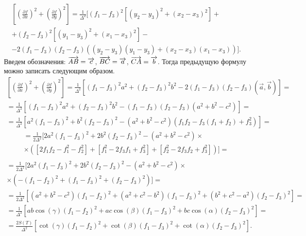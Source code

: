     \begin{eqnarray*}
        \left[\left(\frac{\partial f}{\partial x}\right)^2 + \left(\frac{\partial f}{\partial y}\right)^2 \right] = 
        \frac{1}{\Delta^2} 
        [
            (f_1 - f_3)^2 [(y_2 - y_3)^2 + (x_2 - x_3)^2] + \\ + (f_2 - f_3)^2 [(y_1 - y_3)^2 + (x_1 - x_3)^2] - \\
            - 2 (f_1 - f_3)(f_2 - f_3)((y_2 - y_3)(y_1 - y_3) + (x_2 - x_3)(x_1 - x_3))
        ].
    \end{eqnarray*}
    Введем обозначения: $\overrightarrow{AB} = \overrightarrow{c}$, $\overrightarrow{BC} = \overrightarrow{a}$, $\overrightarrow{CA} = \overrightarrow{b}$. Тогда предыдущую формулу можно записать следующим образом.
    \begin{eqnarray*}
        \left[\left(\frac{\partial f}{\partial x}\right)^2 + \left(\frac{\partial f}{\partial y}\right)^2 \right] = 
        \frac{1}{\Delta^2} 
        \left[
            (f_1 - f_3)^2 a^2 + (f_2 - f_3)^2 b^2 - 2 (f_1 - f_3)(f_2 - f_3)(\vec{a}, \vec{b}) 
        \right] = \\
        = \frac{1}{\Delta^2} 
        \left[
            (f_1 - f_3)^2 a^2 + (f_2 - f_3)^2 b^2 - (f_1 - f_3)(f_2 - f_3)(a^2 + b^2 - c^2) 
        \right] = \\
        = \frac{1}{\Delta^2} 
        \left[
            a^2 (f_1 - f_3)^2 + b^2 (f_2 - f_3)^2 - (a^2 + b^2 - c^2)(f_1 f_2 - f_3(f_1 + f_2) + f_3^2)
        \right] = 
        \end{eqnarray*}
      \begin{multline*}
        = \frac{1}{2 \Delta^2} 
        [
            2 a^2 (f_1 - f_3)^2 + 2 b^2 (f_2 - f_3)^2 - (a^2 + b^2 - c^2) \times \\
            \times ([2 f_1 f_2 - f_1^2 - f_2 ^ 2] + [f_1 ^2 - 2 f_3 f_1 + f_3 ^ 2] + [f_2^2 - 2 f_3 f_2 + f_3^2])
        ] = \\
      \end{multline*}
      \begin{multline*}
        = \frac{1}{2 \Delta^2} 
        [
            2 a^2 (f_1 - f_3)^2 + 2 b^2 (f_2 - f_3)^2 - 
            \left( a^2 + b^2 - c^2 \right) \times \\ \times \left(-(f_1 - f_2)^2 + (f_1 - f_3)^2 + (f_2 - f_3)^2 \right)
        ] = \\
        = \frac{1}{2 \Delta^2} 
        \left[
            (a^2 + b^2 - c^2)(f_1 - f_2)^2 + (a^2 + c^2 - b^2)(f_1 - f_3)^2 + (b^2 + c^2 - a^2)(f_2 - f_3)^2 
        \right] = \\
        = \frac{1}{\Delta^2} 
        \left[
            ab \cos{(\gamma)} (f_1 - f_2)^2 + ac \cos{(\beta)}(f_1 - f_3)^2 + bc \cos{(\alpha)}(f_2 - f_3)^2 
        \right] = \\
        = \frac{2S(T)}{\Delta^2} 
        \left[
            \cot{(\gamma)} (f_1 - f_2)^2 + \cot{(\beta)}(f_1 - f_3)^2 + \cot{(\alpha)}(f_2 - f_3)^2 
        \right].
    \end{multline*}
